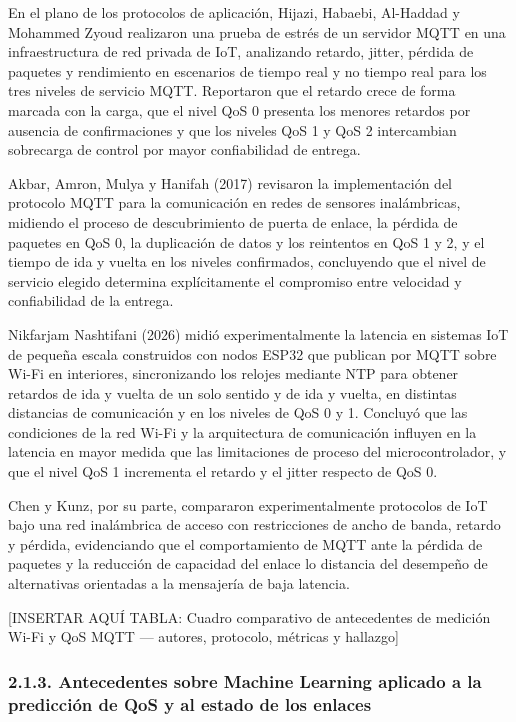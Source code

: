 \documentclass[
  12pt,
]{article}
\begin{document}
En el plano de los protocolos de aplicación, Hijazi, Habaebi, Al-Haddad
y Mohammed Zyoud realizaron una prueba de estrés de un servidor MQTT en
una infraestructura de red privada de IoT, analizando retardo, jitter,
pérdida de paquetes y rendimiento en escenarios de tiempo real y no
tiempo real para los tres niveles de servicio MQTT. Reportaron que el
retardo crece de forma marcada con la carga, que el nivel QoS 0 presenta
los menores retardos por ausencia de confirmaciones y que los niveles
QoS 1 y QoS 2 intercambian sobrecarga de control por mayor confiabilidad
de entrega.

Akbar, Amron, Mulya y Hanifah (2017) revisaron la implementación del
protocolo MQTT para la comunicación en redes de sensores inalámbricas,
midiendo el proceso de descubrimiento de puerta de enlace, la pérdida de
paquetes en QoS 0, la duplicación de datos y los reintentos en QoS 1 y
2, y el tiempo de ida y vuelta en los niveles confirmados, concluyendo
que el nivel de servicio elegido determina explícitamente el compromiso
entre velocidad y confiabilidad de la entrega.

Nikfarjam Nashtifani (2026) midió experimentalmente la latencia en
sistemas IoT de pequeña escala construidos con nodos ESP32 que publican
por MQTT sobre Wi-Fi en interiores, sincronizando los relojes mediante
NTP para obtener retardos de ida y vuelta de un solo sentido y de ida y
vuelta, en distintas distancias de comunicación y en los niveles de QoS
0 y 1. Concluyó que las condiciones de la red Wi-Fi y la arquitectura de
comunicación influyen en la latencia en mayor medida que las
limitaciones de proceso del microcontrolador, y que el nivel QoS 1
incrementa el retardo y el jitter respecto de QoS 0.

Chen y Kunz, por su parte, compararon experimentalmente protocolos de
IoT bajo una red inalámbrica de acceso con restricciones de ancho de
banda, retardo y pérdida, evidenciando que el comportamiento de MQTT
ante la pérdida de paquetes y la reducción de capacidad del enlace lo
distancia del desempeño de alternativas orientadas a la mensajería de
baja latencia.

{[}INSERTAR AQUÍ TABLA: Cuadro comparativo de antecedentes de medición
Wi-Fi y QoS MQTT — autores, protocolo, métricas y hallazgo{]}

\subsubsection{2.1.3. Antecedentes sobre Machine Learning aplicado a la
predicción de QoS y al estado de los
enlaces}\label{antecedentes-sobre-machine-learning-aplicado-a-la-predicciuxf3n-de-qos-y-al-estado-de-los-enlaces}
\end{document}

